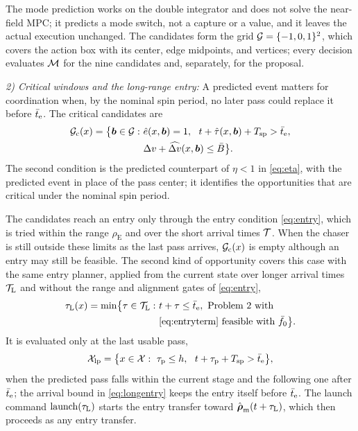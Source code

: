 The mode prediction works on the double integrator and does not solve the near-field MPC; it predicts a mode switch, not a capture or a value, and it leaves the actual execution unchanged. The candidates form the grid $\mathcal{G}=\{-1,0,1\}^{2}$, which covers the action box with its center, edge midpoints, and vertices; every decision evaluates $\mathcal{M}$ for the nine candidates and, separately, for the proposal.

\textit{2) Critical windows and the long-range entry:} A predicted event matters for coordination when, by the nominal spin period, no later pass could replace it before $\bar t_{\mathrm{e}}$. The critical candidates are
\begin{equation}\label{eq:admissible}
\begin{aligned}
\Ga(x)=\bigl\{\bb\in\Gset:\ & \ehat(x,\bb)=1,\ \ t+\tauhat(x,\bb)+\Ts>\te,\\
& \Delta v+\dvhat(x,\bb)\le\Bmax\bigr\}.
\end{aligned}
\end{equation}
The second condition is the predicted counterpart of $\eta<1$ in \eqref{eq:eta}, with the predicted event in place of the pass center; it identifies the opportunities that are critical under the nominal spin period.

The candidates reach an entry only through the entry condition \eqref{eq:entry}, which is tried within the range $\rho_{\mathrm{E}}$ and over the short arrival times $\mathcal{T}$. When the chaser is still outside these limits as the last pass arrives, $\mathcal{G}_{\mathrm{c}}(x)$ is empty although an entry may still be feasible. The second kind of opportunity covers this case with the same entry planner, applied from the current state over longer arrival times $\mathcal{T}_{\mathrm{L}}$ and without the range and alignment gates of \eqref{eq:entry},
\begin{equation}\label{eq:longentry}
\begin{aligned}
\tau_{\mathrm{L}}(x)=\min\bigl\{\tau\in\mathcal{T}_{\mathrm{L}}:\ &t+\tau\le\bar t_{\mathrm{e}},\ \text{Problem~2 with}\\
&\text{\eqref{eq:entryterm} feasible with }\bar f_{0}\bigr\}.
\end{aligned}
\end{equation}
It is evaluated only at the last usable pass,
\begin{equation}\label{eq:lastpass}
\Xlp=\bigl\{x\in\Xset:\ \taup\le h,\ \ t+\taup+\Ts>\te\bigr\},
\end{equation}
when the predicted pass falls within the current stage and the following one after $\bar t_{\mathrm{e}}$; the arrival bound in \eqref{eq:longentry} keeps the entry itself before $\bar t_{\mathrm{e}}$. The launch command $\mathrm{launch}(\tau_{\mathrm{L}})$ starts the entry transfer toward $\hat{\boldsymbol{\rho}}_{\mathrm{m}}(t+\tau_{\mathrm{L}})$, which then proceeds as any entry transfer.

